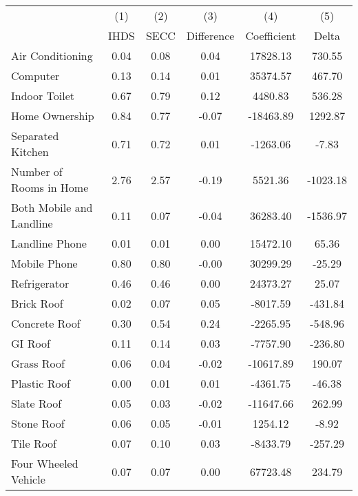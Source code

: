 \begin{tabular}{lccccc}
\hline\hline & (1) & (2) & (3) & (4) & (5) \\
 & IHDS & SECC & Difference & Coefficient & Delta \\
\hline
    Air Conditioning &       0.04 &       0.08 &       0.04 &   17828.13 &     730.55 \\
            Computer &       0.13 &       0.14 &       0.01 &   35374.57 &     467.70 \\
       Indoor Toilet &       0.67 &       0.79 &       0.12 &    4480.83 &     536.28 \\
      Home Ownership &       0.84 &       0.77 &      -0.07 &  -18463.89 &    1292.87 \\
   Separated Kitchen &       0.71 &       0.72 &       0.01 &   -1263.06 &      -7.83 \\
Number of Rooms in Home &       2.76 &       2.57 &      -0.19 &    5521.36 &   -1023.18 \\
Both Mobile and Landline &       0.11 &       0.07 &      -0.04 &   36283.40 &   -1536.97 \\
      Landline Phone &       0.01 &       0.01 &       0.00 &   15472.10 &      65.36 \\
        Mobile Phone &       0.80 &       0.80 &      -0.00 &   30299.29 &     -25.29 \\
        Refrigerator &       0.46 &       0.46 &       0.00 &   24373.27 &      25.07 \\
          Brick Roof &       0.02 &       0.07 &       0.05 &   -8017.59 &    -431.84 \\
       Concrete Roof &       0.30 &       0.54 &       0.24 &   -2265.95 &    -548.96 \\
             GI Roof &       0.11 &       0.14 &       0.03 &   -7757.90 &    -236.80 \\
          Grass Roof &       0.06 &       0.04 &      -0.02 &  -10617.89 &     190.07 \\
        Plastic Roof &       0.00 &       0.01 &       0.01 &   -4361.75 &     -46.38 \\
          Slate Roof &       0.05 &       0.03 &      -0.02 &  -11647.66 &     262.99 \\
          Stone Roof &       0.06 &       0.05 &      -0.01 &    1254.12 &      -8.92 \\
           Tile Roof &       0.07 &       0.10 &       0.03 &   -8433.79 &    -257.29 \\
Four Wheeled Vehicle &       0.07 &       0.07 &       0.00 &   67723.48 &     234.79 \\

\end{tabular}
